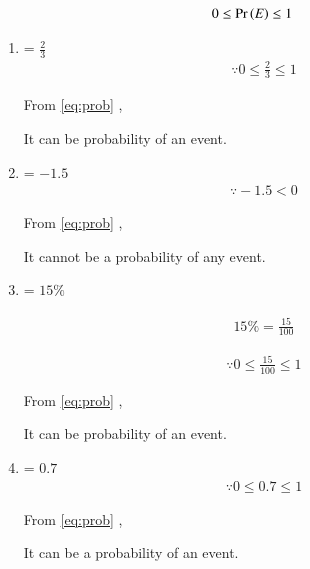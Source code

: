 \documentclass[journal,12pt,twocolumn]{IEEEtran}
\begin{document}
\begin{align}
   \label{eq:prob}
   0 \le \Pr\left(E\right)\le 1 
\end{align}
\begin{enumerate}
    

\item {} = \(\displaystyle\frac{2}{3}\)
\begin{align}
    \because 0 \le \displaystyle\frac{2}{3} \le 1
\end{align}

From \eqref{eq:prob} ,

 It can be probability of an event.

\item {} = \(-1.5\)
\begin{align}
\because  -1.5 < 0 
\end{align}

From \eqref{eq:prob} ,

It cannot be a probability of any event.

\item {} = \(15\%\)

\begin{align}
15\%=\displaystyle\frac{15}{100}
\end{align}

\begin{align}
\because 0 \le \displaystyle\frac{15}{100} \le 1
\end{align}

From \eqref{eq:prob} ,

\indent It can be probability of an event.

\item {} = \(0.7\) 
\begin{align}
\because 0 \le 0.7 \le 1 
\end{align}

From \eqref{eq:prob} ,

It can be a probability of an event.
\end{enumerate}
\end{document}
